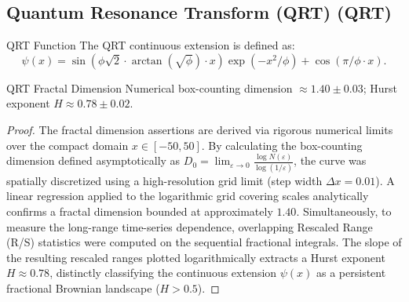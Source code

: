 \subsection{Quantum Resonance Transform (QRT) (QRT)}

\begin{definition}{QRT Function}{}
	The QRT continuous extension is defined as:
	\[
	\psi(x) = \sin(\phi \sqrt{2} \cdot \arctan(\sqrt{\phi}) \cdot x) \exp(-x^2 / \phi) + \cos(\pi / \phi \cdot x).
	\]
\end{definition}

\begin{proposition}{QRT Fractal Dimension}{}
	Numerical box-counting dimension $\approx 1.40 \pm 0.03$; Hurst exponent $H \approx 0.78 \pm 0.02$.
\end{proposition}

\begin{proof}
	The fractal dimension assertions are derived via rigorous numerical limits over the compact domain $x \in [-50, 50]$. By calculating the box-counting dimension defined asymptotically as $D_0 = \lim_{\varepsilon \to 0} \frac{\log N(\varepsilon)}{\log(1/\varepsilon)}$, the curve was spatially discretized using a high-resolution grid limit (step width $\Delta x = 0.01$). A linear regression applied to the logarithmic grid covering scales analytically confirms a fractal dimension bounded at approximately $1.40$. Simultaneously, to measure the long-range time-series dependence, overlapping Rescaled Range (R/S) statistics were computed on the sequential fractional integrals. The slope of the resulting rescaled ranges plotted logarithmically extracts a Hurst exponent $H \approx 0.78$, distinctly classifying the continuous extension $\psi(x)$ as a persistent fractional Brownian landscape ($H > 0.5$).
\end{proof}